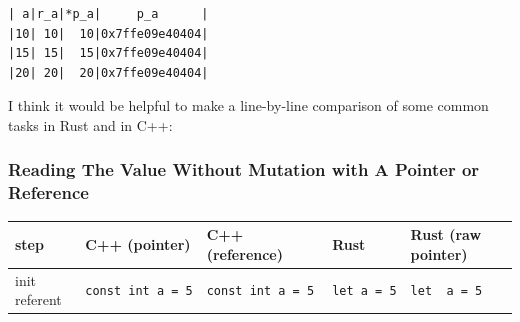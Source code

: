 \documentclass[
]{book}
\begin{document}
\begin{verbatim}
| a|r_a|*p_a|     p_a      |
|10| 10|  10|0x7ffe09e40404|
|15| 15|  15|0x7ffe09e40404|
|20| 20|  20|0x7ffe09e40404|
\end{verbatim}

I think it would be helpful to make a line-by-line comparison of some common tasks in Rust and in C++:

\hypertarget{reading-the-value-without-mutation-with-a-pointer-or-reference}{%
\subsubsection{Reading The Value Without Mutation with A Pointer or Reference}\label{reading-the-value-without-mutation-with-a-pointer-or-reference}}

\begin{longtable}[]{@{}lllll@{}}
\toprule
\begin{minipage}[b]{0.16\columnwidth}\raggedright
step\strut
\end{minipage} & \begin{minipage}[b]{0.16\columnwidth}\raggedright
C++ (pointer)\strut
\end{minipage} & \begin{minipage}[b]{0.16\columnwidth}\raggedright
C++ (reference)\strut
\end{minipage} & \begin{minipage}[b]{0.16\columnwidth}\raggedright
Rust\strut
\end{minipage} & \begin{minipage}[b]{0.22\columnwidth}\raggedright
Rust (raw pointer)\strut
\end{minipage}\tabularnewline
\midrule
\endhead
\begin{minipage}[t]{0.16\columnwidth}\raggedright
init referent\strut
\end{minipage} & \begin{minipage}[t]{0.16\columnwidth}\raggedright
\texttt{const\ int\ a\ =\ 5}\strut
\end{minipage} & \begin{minipage}[t]{0.16\columnwidth}\raggedright
\texttt{const\ int\ a\ =\ 5}\strut
\end{minipage} & \begin{minipage}[t]{0.16\columnwidth}\raggedright
\texttt{let\ a\ =\ 5}\strut
\end{minipage} & \begin{minipage}[t]{0.22\columnwidth}\raggedright
\texttt{let\ \ a\ =\ 5}\strut

\end{minipage}
\end{longtable}
\end{document}
